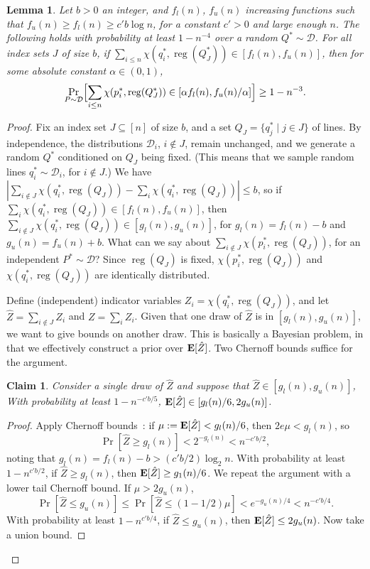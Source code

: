 \documentclass[letterpaper,11pt]{article}
\newtheorem{lemma}[theorem]{Lemma}
\newtheorem{claim}[theorem]{Claim}
\newcommand{\EX}{\hbox{\bf E}}
\DeclareMathOperator{\reg}{reg}
\newcommand{\cD}{\mathcal{D}}
\begin{document}
\begin{lemma}\label{lem:rand-const} 
  Let $b > 0$ an integer, and 
  $f_l(n)$, $f_u(n)$ increasing 
  functions such that 
  $f_u(n) \geq f_l(n) \geq c'b\log n$,
  for a constant $c' > 0$ and large enough
  $n$. The 
  following holds with probability at 
  least $1 - n^{-4}$ over a random 
  $Q^* \sim \cD$.  For all index sets 
  $J$ of size $b$, if 
  $\sum_{i \leq n} \chi(q^*_i,\reg(Q^*_{J})) \in [f_l(n), f_u(n)]$, 
  then for some absolute constant $\alpha \in (0,1)$,
  \[
    \Pr_{P \sim \cD}\Bigl[\sum_{i \leq n} 
      \chi(p^*_i,\reg(Q^*_{J})) \in [\alpha f_l(n), f_u(n)/\alpha]\Bigr] 
      \geq 1 - n^{-3}.
\]
\end{lemma}

\begin{proof} 
Fix an index set $J \subseteq [n]$ of size $b$,
and a set $Q_J = \{q^*_j \mid j \in J\}$
of lines. By independence, the distributions
$\cD_i$, $i \notin J$, remain unchanged, 
and we generate a random 
$Q^*$ conditioned on $Q_J$ being fixed. 
(This means that we sample random 
lines $q^*_i \sim \cD_i$, for $i \notin J$.) 
We have 
$|\sum_{i \notin J} \chi(q^*_i,\reg(Q_J)) - 
\sum_{i} \chi(q^*_i,\reg(Q_J))| \leq b$, 
so if 
$\sum_{i} \chi(q^*_i,\reg(Q_J)) \in [f_l(n), f_u(n)]$, 
then 
$\sum_{i \notin J} \chi(q^*_i,\reg(Q_J)) \in [g_l(n), g_u(n)]$,
for $g_l(n) = f_l(n) - b$ 
and $g_u(n) = f_u(n) + b$.
What can we say about 
$\sum_{i \notin J} \chi(p^*_i,\reg(Q_J))$, 
for an independent $P^* \sim \cD$? 
Since $\reg(Q_J)$ is fixed,
$\chi(p^*_i,\reg(Q_J))$ and 
$\chi(q^*_i, \reg(Q_J))$ are 
identically distributed.

Define (independent) indicator variables 
$Z_{i} = \chi(q^*_i,\reg(Q_J))$, 
and let 
$\hat{Z} = \sum_{i \notin J} Z_{i}$ and 
$Z = \sum_{i} Z_{i}$. 
Given that one draw of 
$\hat{Z}$ is in $[g_l(n), g_u(n)]$, 
we want to give bounds on another draw.
This is basically a Bayesian problem, 
in that we effectively construct 
a prior over $\EX[\hat{Z}]$.
Two Chernoff bounds suffice 
for the argument. 

\begin{claim}\label{clm:cher} 
  Consider a single draw of 
  $\hat{Z}$ and suppose that 
  $\hat{Z} \in [g_l(n), g_u(n)]$,
  With probability at least 
  $1 - n^{-c'b/5}$, 
  $\EX[\hat{Z}] \in [g_l(n)/6, 2g_u(n)]$.
\end{claim}

\begin{proof} 
Apply Chernoff 
bounds~\cite[Theorem~1.1]{DubhashiPa09}:
if $\mu := \EX[\hat{Z}] < g_l(n)/6$,
then $2e\mu < g_l(n)$, so 
\[
  \Pr[\hat{Z} \geq g_l(n)] < 2^{-g_l(n)} < n^{-c'b/2},
\]
noting that 
$g_l(n) = f_l(n) - b > (c'b/2)\log_2 n$.
With probability at least 
$1 - n^{c'b/2}$, if $\hat{Z} \geq g_l(n)$, 
then $\EX[\hat{Z}] \geq g_1(n)/6$.
We repeat the argument with 
a lower tail Chernoff bound. 
If $\mu > 2g_u(n)$, 
\[
  \Pr[\hat{Z} \leq g_u(n)] \leq \Pr[\hat{Z} \leq (1 - 1/2)\mu] < 
  e^{-g_u(n)/4} < n^{-c'b/4}.
\]
With probability at least 
$1 - n^{c'b/4}$, if $\hat{Z} \leq g_u(n)$, 
then $\EX[\hat{Z}] \leq 2g_u(n)$.
Now take a union bound.
\end{proof}


\end{proof}
\end{document}
